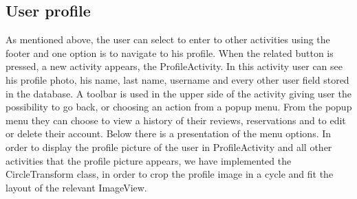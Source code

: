 \documentclass[12pt]{article}
\begin{document}
	\subsection{User profile}
	As mentioned above, the user can select to enter to other activities using the footer and one option is to navigate to his profile. When the related button is pressed, a new activity appears, the ProfileActivity. In this activity user can see his profile photo, his name, last name, username  and every other user field stored in the database. A toolbar is used in the upper side of the activity giving user the possibility to go back, or choosing an action from a popup menu. From the popup menu they can choose to view a history of their reviews, reservations and to edit or delete their account. Below there is a presentation of the menu options.
	In order to display the profile picture of the user in ProfileActivity and all other activities that the profile picture appears, we have implemented the CircleTransform class, in order to crop the profile image in a cycle and fit the layout of the relevant ImageView. 
	
\end{document}
